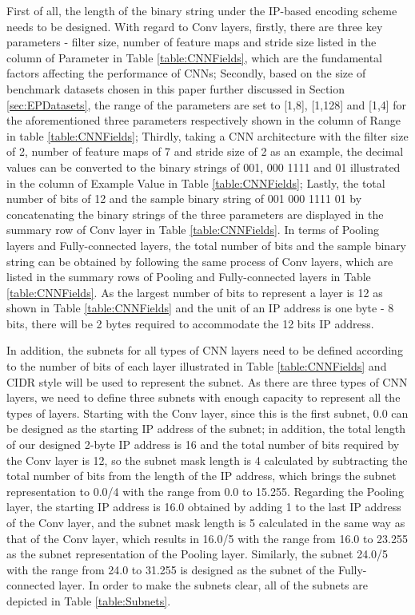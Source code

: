 \documentclass[conference]{IEEEtran}
\begin{document}
First of all, the length of the binary string under the IP-based encoding scheme needs to be designed. With regard to Conv layers, firstly, there are three key parameters - filter size, number of feature maps and stride size listed in the column of Parameter in Table \ref{table:CNNFields}, which are the fundamental factors affecting the performance of CNNs; Secondly, based on the size of benchmark datasets chosen in this paper further discussed in Section \ref{sec:EPDatasets}, the range of the parameters are set to [1,8], [1,128] and [1,4] for the aforementioned three parameters respectively shown in the column of Range in table \ref{table:CNNFields}; Thirdly, taking a CNN architecture with the filter size of 2, number of feature maps of 7 and stride size of 2 as an example, the decimal values can be converted to the binary strings of 001, 000 1111 and 01 illustrated in the column of Example Value in Table \ref{table:CNNFields}; Lastly, the total number of bits of 12 and the sample binary string of 001 000 1111 01 by concatenating the binary strings of the three parameters are displayed in the summary row of Conv layer in Table \ref{table:CNNFields}. In terms of Pooling layers and Fully-connected layers, the total number of bits and the sample binary string can be obtained by following the same process of Conv layers, which are listed in the summary rows of Pooling and Fully-connected layers in Table \ref{table:CNNFields}.  As the largest number of bits to represent a layer is 12 as shown in Table \ref{table:CNNFields} and the unit of an IP address is one byte - 8 bits, there will be 2 bytes required to accommodate the 12 bits IP address. 


In addition, the subnets for all types of CNN layers need to be defined according to the number of bits of each layer illustrated in Table \ref{table:CNNFields} and CIDR style will be used to represent the subnet. As there are three types of CNN layers, we need to define three subnets with enough capacity to represent all the types of layers. Starting with the Conv layer, since this is the first subnet, 0.0 can be designed as the starting IP address of the subnet; in addition, the total length of our designed 2-byte IP address is 16 and the total number of bits required by the Conv layer is 12, so the subnet mask length is 4 calculated by subtracting the total number of bits from the length of the IP address, which brings the subnet representation to 0.0/4 with the range from 0.0 to 15.255. Regarding the Pooling layer, the starting IP address is 16.0 obtained by adding 1 to the last IP address of the Conv layer, and the subnet mask length is 5 calculated in the same way as that of the Conv layer, which results in 16.0/5 with the range from 16.0 to 23.255 as the subnet representation of the Pooling layer. Similarly, the subnet 24.0/5 with the range from 24.0 to 31.255 is designed as the subnet of the Fully-connected layer. In order to make the subnets clear, all of the subnets are depicted in Table \ref{table:Subnets}. 
\end{document}
